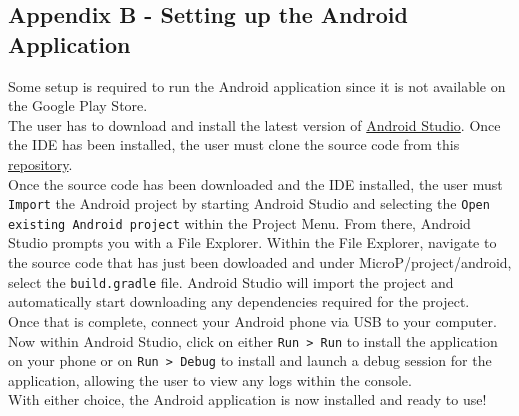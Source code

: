 \subsection*{Appendix B - Setting up the Android Application}
Some setup is required to run the Android application since it is not available on the Google Play Store.\\
The user has to download and install the latest version of \href{https://developer.android.com/studio/index.html}{Android Studio}.
Once the IDE has been installed, the user must clone the source code from this \href{https://github.com/lebrice/MicroP}{repository}.\\ 
Once the source code has been downloaded and the IDE installed, the user must \texttt{Import} the Android project by starting Android Studio and selecting the \texttt{Open existing Android project} within the Project Menu. 
From there, Android Studio prompts you with a File Explorer. Within the File Explorer, navigate to the source code that has just been dowloaded and under MicroP/project/android, select the \texttt{build.gradle} file. Android Studio will import the project and automatically start downloading any dependencies required for the project.\\
Once that is complete, connect your Android phone via USB to your computer. Now within Android Studio, click on either \texttt{Run > Run} to install the application on your phone or on \texttt{Run > Debug} to install and launch a debug session for the application, allowing the user to view any logs within the console.\\
With either choice, the Android application is now installed and ready to use!